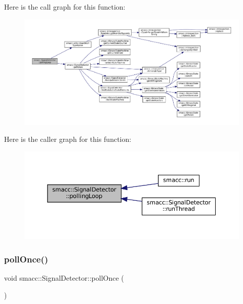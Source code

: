 Here is the call graph for this function\+:
\nopagebreak
\begin{figure}[H]
\begin{center}
\leavevmode
\includegraphics[width=350pt]{classsmacc_1_1SignalDetector_a2665e66cdae9f6533c64bbcecf3fa199_cgraph}
\end{center}
\end{figure}
Here is the caller graph for this function\+:
\nopagebreak
\begin{figure}[H]
\begin{center}
\leavevmode
\includegraphics[width=350pt]{classsmacc_1_1SignalDetector_a2665e66cdae9f6533c64bbcecf3fa199_icgraph}
\end{center}
\end{figure}
\mbox{\label{classsmacc_1_1SignalDetector_a9a116479e23259f3a5d5d4a47278afd5}} 
\subsubsection{\texorpdfstring{poll\+Once()}{pollOnce()}}
{\footnotesize\ttfamily void smacc\+::\+Signal\+Detector\+::poll\+Once (\begin{DoxyParamCaption}{ }\end{DoxyParamCaption})}

